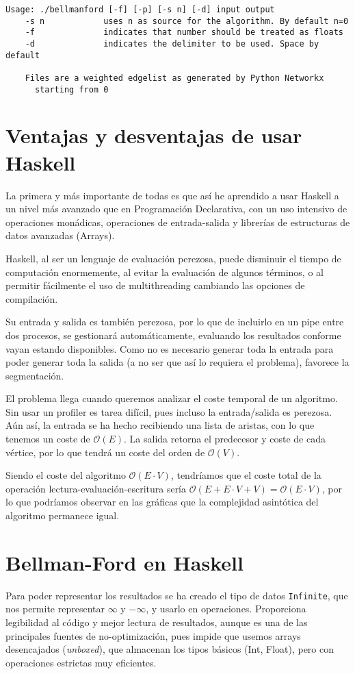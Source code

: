 \documentclass{article}
\begin{document}
\begin{verbatim}
Usage: ./bellmanford [-f] [-p] [-s n] [-d] input output
    -s n            uses n as source for the algorithm. By default n=0
    -f              indicates that number should be treated as floats
    -d              indicates the delimiter to be used. Space by default

    Files are a weighted edgelist as generated by Python Networkx
      starting from 0
\end{verbatim}

\section{Ventajas y desventajas de usar Haskell}
La primera y más importante de todas es que así he aprendido a usar Haskell a un nivel más avanzado que en Programación Declarativa, con un uso intensivo de operaciones monádicas, operaciones de entrada-salida y librerías de estructuras de datos avanzadas (Arrays).

Haskell, al ser un lenguaje de evaluación perezosa, puede disminuir el tiempo de computación enormemente, al evitar la evaluación de algunos términos, o al permitir fácilmente el uso de multithreading cambiando las opciones de compilación.

Su entrada y salida es también perezosa, por lo que de incluirlo en un pipe entre dos procesos, se gestionará automáticamente, evaluando los resultados conforme vayan estando disponibles. Como no es necesario generar toda la entrada para poder generar toda la salida (a no ser que así lo requiera el problema), favorece la segmentación.

El problema llega cuando queremos analizar el coste temporal de un algoritmo. Sin usar un profiler es tarea difícil, pues incluso la entrada/salida es perezosa. Aún así, la entrada se ha hecho recibiendo una lista de aristas, con lo que tenemos un coste de $\mathcal{O}\left(E\right)$. La salida retorna el predecesor y coste de cada vértice, por lo que tendrá un coste del orden de $\mathcal{O}\left(V\right)$.

Siendo el coste del algoritmo $\mathcal{O}\left(E\cdot V\right)$, tendríamos que el coste total de la operación lectura-evaluación-escritura sería $\mathcal{O}\left(E + E\cdot V + V\right)=\mathcal{O}\left(E\cdot V\right)$, por lo que podríamos observar en las gráficas que la complejidad asintótica del algoritmo permanece igual.

\section{Bellman-Ford en Haskell}
Para poder representar los resultados se ha creado el tipo de datos \texttt{Infinite}, que nos permite representar $\infty$ y $-\infty$, y usarlo en operaciones. Proporciona legibilidad al código y mejor lectura de resultados, aunque es una de las principales fuentes de no-optimización, pues impide que usemos arrays desencajados (\textit{unboxed}), que almacenan los tipos básicos (Int, Float), pero con operaciones estrictas muy eficientes.
\end{document}
